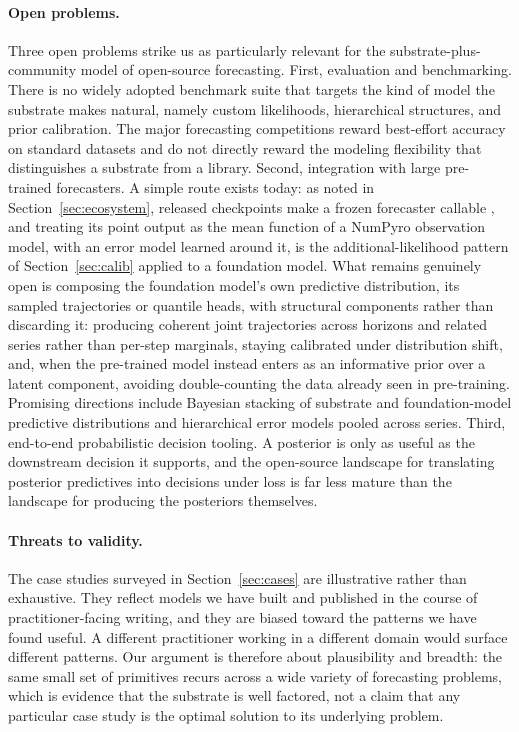 \documentclass[11pt,3p,review,authoryear]{elsarticle}
\begin{document}
\paragraph{Open problems.}
Three open problems strike us as particularly relevant for the substrate-plus-community model of open-source forecasting. First, evaluation and benchmarking. There is no widely adopted benchmark suite that targets the kind of model the substrate makes natural, namely custom likelihoods, hierarchical structures, and prior calibration. The major forecasting competitions reward best-effort accuracy on standard datasets and do not directly reward the modeling flexibility that distinguishes a substrate from a library. Second, integration with large pre-trained forecasters. A simple route exists today: as noted in Section~\ref{sec:ecosystem}, released checkpoints make a frozen forecaster callable \citep{ansari2025chronos2, cohen2025toto}, and treating its point output as the mean function of a NumPyro observation model, with an error model learned around it, is the additional-likelihood pattern of Section~\ref{sec:calib} applied to a foundation model. What remains genuinely open is composing the foundation model's own predictive distribution, its sampled trajectories or quantile heads, with structural components rather than discarding it: producing coherent joint trajectories across horizons and related series rather than per-step marginals, staying calibrated under distribution shift, and, when the pre-trained model instead enters as an informative prior over a latent component, avoiding double-counting the data already seen in pre-training. Promising directions include Bayesian stacking of substrate and foundation-model predictive distributions \citep{yao2018stacking} and hierarchical error models pooled across series. Third, end-to-end probabilistic decision tooling. A posterior is only as useful as the downstream decision it supports, and the open-source landscape for translating posterior predictives into decisions under loss is far less mature than the landscape for producing the posteriors themselves.

\paragraph{Threats to validity.}
The case studies surveyed in Section~\ref{sec:cases} are illustrative rather than exhaustive. They reflect models we have built and published in the course of practitioner-facing writing, and they are biased toward the patterns we have found useful. A different practitioner working in a different domain would surface different patterns. Our argument is therefore about plausibility and breadth: the same small set of primitives recurs across a wide variety of forecasting problems, which is evidence that the substrate is well factored, not a claim that any particular case study is the optimal solution to its underlying problem.
\end{document}
